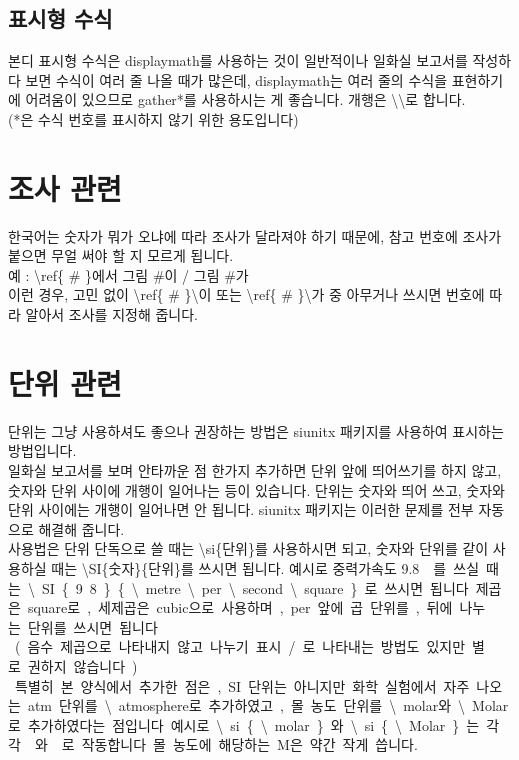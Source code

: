 \documentclass[a4paper,10pt]{article}
\begin{document}
	
	\subsection{표시형 수식}
	본디 표시형 수식은 displaymath를 사용하는 것이 일반적이나 일화실 보고서를
	작성하다 보면 수식이 여러 줄 나올 때가 많은데, displaymath는 여러 줄의
	수식을 표현하기에 어려움이 있으므로 gather*를 사용하시는 게 좋습니다.
	개행은 \textbackslash\textbackslash 로 합니다. \\
	(*은 수식 번호를 표시하지 않기 위한 용도입니다)
	
	\section{조사 관련}
	한국어는 숫자가 뭐가 오냐에 따라 조사가 달라져야 하기 때문에, 참고 번호에 조사가 붙으면 무얼 써야 할 지 모르게 됩니다. \\
	예 : \textbackslash ref\{ \# \}에서 그림 \#이 / 그림 \#가 \\
	이런 경우, 고민 없이 \textbackslash ref\{ \# \}\textbackslash 이 또는
	\textbackslash ref\{ \# \}\textbackslash 가 중 아무거나 쓰시면 번호에 따라
	알아서 조사를 지정해 줍니다. 
	
	\section{단위 관련}
	단위는 그냥 사용하셔도 좋으나 권장하는 방법은 siunitx 패키지를 사용하여
	표시하는 방법입니다.\\
	일화실 보고서를 보며 안타까운 점 한가지 추가하면 단위 앞에 띄어쓰기를
	하지 않고, 숫자와 단위 사이에 개행이 일어나는 등이 있습니다.
	단위는 숫자와 띄어 쓰고, 숫자와 단위 사이에는 개행이 일어나면 안 됩니다.
	siunitx 패키지는 이러한 문제를 전부 자동으로 해결해 줍니다.\\
	사용법은 단위 단독으로 쓸 때는
	\textbackslash si\{단위\}를 사용하시면 되고,
	숫자와 단위를 같이 사용하실 때는
	\textbackslash SI\{숫자\}\{단위\}를 쓰시면 됩니다.
	예시로 중력가속도 \SI{9.8}{\metre\per\second\square}를 쓰실 때는
	\textbackslash SI\{9.8\}\{\textbackslash metre\textbackslash
	per\textbackslash second\textbackslash square\}로 쓰시면 됩니다.
	제곱은 square로, 세제곱은 cubic으로 사용하며,
	per 앞에 곱 단위를, 뒤에 나누는 단위를 쓰시면 됩니다.\\
	(음수 제곱으로 나타내지 않고 나누기 표시 /로 나타내는 방법도 있지만
	별로 권하지 않습니다.) \\
	특별히 본 양식에서 추가한 점은, SI 단위는 아니지만
	화학 실험에서 자주 나오는 atm 단위를 \textbackslash atmosphere로
	추가하였고, 몰 농도 단위를
	\textbackslash molar와 \textbackslash Molar로 추가하였다는 점입니다.
	예시로 \textbackslash si\{\textbackslash molar\} 와
	\textbackslash si\{\textbackslash Molar\}는
	각각 \si{\molar} 와 \si{\Molar}로 작동합니다.
	몰 농도에 해당하는 M은 약간 작게 씁니다.
	
\end{document}
